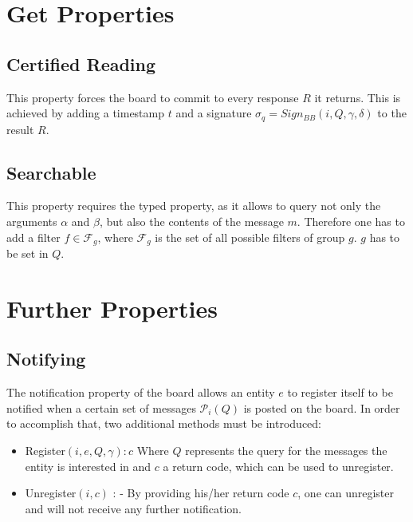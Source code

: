 \documentclass[bibtotoc,halfparskip,oneside]{scrreprt}
\begin{document}
\section{Get Properties}

\subsection{Certified Reading}

This property forces the board to commit to every response $R$ it returns. This is achieved by adding a timestamp $t$ and a signature $\sigma_q=Sign_{BB}(i, Q,\gamma, \delta)$ to the result $R$.

\subsection{Searchable}

This property requires the typed property, as it allows to query not only the arguments $\alpha$ and $\beta$, but also the contents of the message $m$. Therefore one has to add a filter $f\in\mathcal{F}_g$, where $\mathcal{F}_g$ is the set of all possible filters of group $g$. $g$ has to be set in $Q$.

\section{Further Properties}

\subsection{Notifying}

The notification property of the board allows an entity  $e$ to register itself to be notified when a certain set of messages $\mathcal{P}_i(Q)$ is posted on the board. In order to accomplish that, two additional methods must be introduced:

\begin{itemize}
	\item Register$(i, e, Q ,\gamma): c$ \newline Where $Q$ represents the query for the messages the entity is interested in and $c$ a return code, which can be used to unregister. 
	\item Unregister$(i, c)$ : - \newline By providing his/her return code $c$, one can unregister and will not receive any further notification.
\end{itemize}
\end{document}
